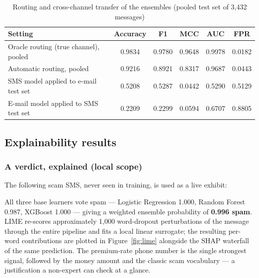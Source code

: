 \documentclass[12pt,a4paper]{report}
\begin{document}
\begin{table}[!htbp]
  \centering
  \caption{Routing and cross-channel transfer of the ensembles (pooled test set of 3,432 messages)}
  \label{tab:routing}
  \setlength{\tabcolsep}{4pt}
  \begin{tabular}{|L{5.6cm}|c|c|c|c|c|}
    \hline
    \textbf{Setting} & \textbf{Accuracy} & \textbf{F1} & \textbf{MCC} & \textbf{AUC} & \textbf{FPR} \\
    \hline
    Oracle routing (true channel), pooled & 0.9834 & 0.9780 & 0.9648 & 0.9978 & 0.0182 \\
    \hline
    Automatic routing, pooled & 0.9216 & 0.8921 & 0.8317 & 0.9687 & 0.0443 \\
    \hline
    SMS model applied to e-mail test set & 0.5208 & 0.5287 & 0.0442 & 0.5290 & 0.5129 \\
    \hline
    E-mail model applied to SMS test set & 0.2209 & 0.2299 & 0.0594 & 0.6707 & 0.8805 \\
    \hline
  \end{tabular}
\end{table}

\subsection{Explainability results}

\subsubsection{A verdict, explained (local scope)}

The following scam SMS, never seen in training, is used as a live exhibit:

\begin{center}
\end{center}

All three base learners vote spam --- Logistic Regression 1.000, Random
Forest 0.987, XGBoost 1.000 --- giving a weighted ensemble probability of
\textbf{0.996 spam}. LIME re-scores approximately 1,000 word-dropout
perturbations of the message through the entire pipeline and fits a local
linear surrogate; the resulting per-word contributions are plotted in
Figure~\ref{fig:lime} alongside the SHAP waterfall of the same prediction.
The premium-rate phone number is the single strongest signal, followed by the
money amount and the classic scam vocabulary --- a justification a non-expert
can check at a glance.
\end{document}
